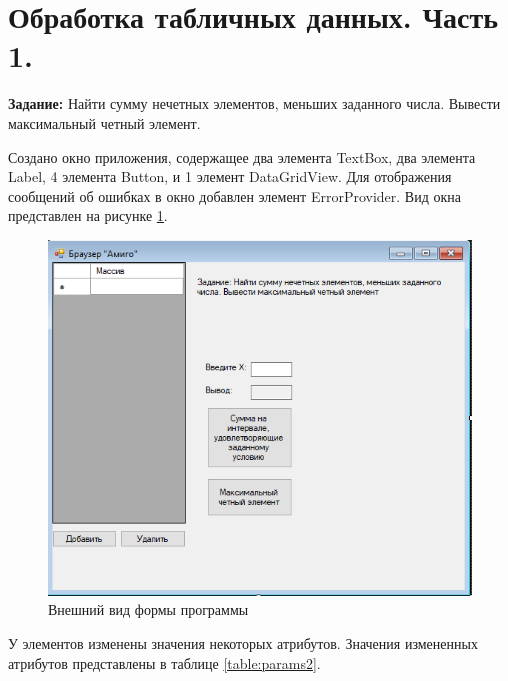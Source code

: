 \section{Обработка табличных данных. Часть 1.}

\textbf{Задание:} Найти сумму нечетных элементов, меньших заданного числа. 
Вывести максимальный четный элемент. 

Создано окно приложения, содержащее два элемента TextBox, два элемента Label, 4 элемента Button, и 1 элемент DataGridView. 
Для отображения сообщений об ошибках в окно добавлен элемент ErrorProvider. Вид окна представлен на рисунке \ref{fig:task4_form}.

\begin{figure}[H]
    \centering
    \includegraphics{task4/form.png}
    \caption{Внешний вид формы программы}
    \label{fig:task4_form}
\end{figure}

У элементов изменены значения некоторых атрибутов. 
Значения измененных атрибутов представлены в таблице \ref{table:params2}.

